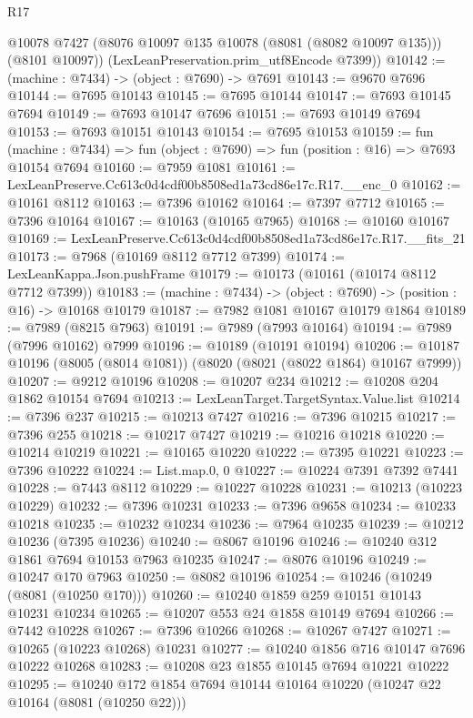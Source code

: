 \begin{lexlean}{R17}
\begin{coremodule}
        @10078
        @7427
        (@8076 @10097 @135 @10078 (@8081 (@8082 @10097 @135)))
        (@8101 @10097))
      (LexLeanPreservation.prim_utf8Encode @7399))
@10142 := (machine : @7434) -> (object : @7690) -> @7691
@10143 := @9670 @7696
@10144 := @7695 @10143
@10145 := @7695 @10144
@10147 := @7693 @10145 @7694
@10149 := @7693 @10147 @7696
@10151 := @7693 @10149 @7694
@10153 := @7693 @10151 @10143
@10154 := @7695 @10153
@10159 := fun (machine : @7434) =>
  fun (object : @7690) => fun (position : @16) => @7693 @10154 @7694
@10160 := @7959 @1081
@10161 := LexLeanPreserve.Cc613c0d4cdf00b8508ed1a73cd86e17c.R17.__enc_0
@10162 := @10161 @8112
@10163 := @7396 @10162
@10164 := @7397 @7712
@10165 := @7396 @10164
@10167 := @10163 (@10165 @7965)
@10168 := @10160 @10167
@10169 := LexLeanPreserve.Cc613c0d4cdf00b8508ed1a73cd86e17c.R17.__fits_21
@10173 := @7968 (@10169 @8112 @7712 @7399)
@10174 := LexLeanKappa.Json.pushFrame
@10179 := @10173 (@10161 (@10174 @8112 @7712 @7399))
@10183 := (machine : @7434) -> (object : @7690) -> (position : @16) -> @10168 @10179
@10187 := @7982 @1081 @10167 @10179 @1864
@10189 := @7989 (@8215 @7963)
@10191 := @7989 (@7993 @10164)
@10194 := @7989 (@7996 @10162) @7999
@10196 := @10189 (@10191 @10194)
@10206 := @10187 @10196 (@8005 (@8014 @1081)) (@8020 (@8021 (@8022 @1864) @10167 @7999))
@10207 := @9212 @10196
@10208 := @10207 @234
@10212 := @10208 @204 @1862 @10154 @7694
@10213 := LexLeanTarget.TargetSyntax.Value.list
@10214 := @7396 @237
@10215 := @10213 @7427
@10216 := @7396 @10215
@10217 := @7396 @255
@10218 := @10217 @7427
@10219 := @10216 @10218
@10220 := @10214 @10219
@10221 := @10165 @10220
@10222 := @7395 @10221
@10223 := @7396 @10222
@10224 := List.map.{0, 0}
@10227 := @10224 @7391 @7392 @7441
@10228 := @7443 @8112
@10229 := @10227 @10228
@10231 := @10213 (@10223 @10229)
@10232 := @7396 @10231
@10233 := @7396 @9658
@10234 := @10233 @10218
@10235 := @10232 @10234
@10236 := @7964 @10235
@10239 := @10212 @10236 (@7395 @10236)
@10240 := @8067 @10196
@10246 := @10240 @312 @1861 @7694 @10153 @7963 @10235
@10247 := @8076 @10196
@10249 := @10247 @170 @7963
@10250 := @8082 @10196
@10254 := @10246 (@10249 (@8081 (@10250 @170)))
@10260 := @10240 @1859 @259 @10151 @10143 @10231 @10234
@10265 := @10207 @553 @24 @1858 @10149 @7694
@10266 := @7442 @10228
@10267 := @7396 @10266
@10268 := @10267 @7427
@10271 := @10265 (@10223 @10268) @10231
@10277 := @10240 @1856 @716 @10147 @7696 @10222 @10268
@10283 := @10208 @23 @1855 @10145 @7694 @10221 @10222
@10295 := @10240 @172 @1854 @7694 @10144 @10164 @10220 (@10247 @22 @10164 (@8081 (@10250 @22)))

\end{coremodule}
\end{lexlean}
